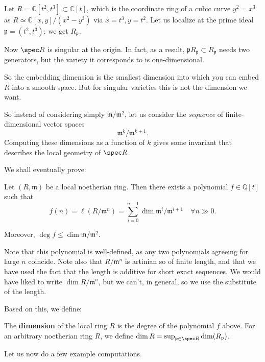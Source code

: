 \begin{example} 
Let $R = \mathbb{C}[t^2, t^3] \subset \mathbb{C}[t]$, which is the coordinate
ring of a cubic curve $y^2 =x^3$ as $R \simeq \mathbb{C}[x,y]/(x^2 - y^3)$
via $x = t^3, y = t^2$. Let us localize at the prime ideal $\mathfrak{p} = (t^2,
t^3)$: we get $R_{\mathfrak{p}}$. 

Now $\spec R$ is singular at the origin. In fact, as a result, $\mathfrak{p}
R_{\mathfrak{p}} \subset R_{\mathfrak{p}}$ needs two generators, but the
variety it corresponds to is one-dimensional.
\end{example} 

So the embedding dimension is the smallest dimension into which you can embed
$R$ into a smooth space.
But for singular varieties this is not the dimension we want. 

So instead of considering simply $\mathfrak{m}/\mathfrak{m}^2$, let us
consider the \emph{sequence} of finite-dimensional vector spaces
\[ \mathfrak{m}^k/\mathfrak{m}^{k+1}.  \]
Computing these dimensions as a function of $k$ gives some invariant that describes the local
geometry of $\spec R$.

We shall eventually prove:
\begin{theorem} \label{hilbfnispolynomial}
Let $(R, \mathfrak{m})$ be a local noetherian ring. Then there exists a
polynomial
$f \in \mathbb{Q}[t]$ such that
\[ f(n) =  \ell(R/\mathfrak{m}^n) = \sum_{i=0}^{n-1} \dim
\mathfrak{m}^i/\mathfrak{m}^{i+1} \quad \forall n \gg 0.  \]

Moreover, $\deg f \leq \dim \mathfrak{m}/\mathfrak{m}^2$.
\end{theorem}


Note that this polynomial is well-defined, as any two polynomials agreeing for large $n$
coincide. Note also that $R/\mathfrak{m}^n$ is artinian so of finite length,
and that we have used the fact that the length is additive for short exact
sequences. We would have liked to write $\dim R/\mathfrak{m}^n$, but we can't,
in general, so we use the substitute of the length. 

Based on this, we define:
\begin{definition} 
The \textbf{dimension} of the local ring $R$ is the degree of the polynomial
$f$ above. For an arbitrary noetherian ring $R$, we define $\dim R =
\sup_{\mathfrak{p} \in \spec R} \dim (R_{\mathfrak{p}})$.
\end{definition} 


Let us now do a few example computations. 

